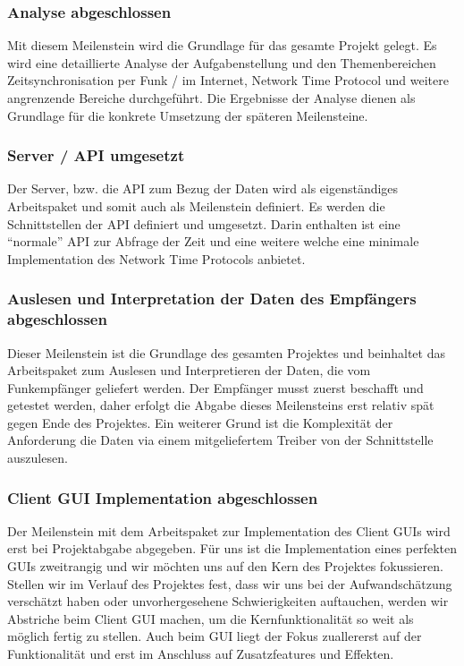 \subsubsection{Analyse abgeschlossen}
Mit diesem Meilenstein wird die Grundlage für das gesamte Projekt gelegt. Es wird eine detaillierte Analyse der Aufgabenstellung und den Themenbereichen Zeitsynchronisation per Funk / im Internet, Network Time Protocol und weitere angrenzende Bereiche durchgeführt. Die Ergebnisse der Analyse dienen als Grundlage für die konkrete Umsetzung der späteren Meilensteine.

\subsubsection{Server / API umgesetzt}
Der Server, bzw. die API zum Bezug der Daten wird als eigenständiges Arbeitspaket und somit auch als Meilenstein definiert. Es werden die Schnittstellen der API definiert und umgesetzt. Darin enthalten ist eine "`normale"' API zur Abfrage der Zeit und eine weitere welche eine minimale Implementation des Network Time Protocols anbietet.

\subsubsection{Auslesen und Interpretation der Daten des Empfängers abgeschlossen}
Dieser Meilenstein ist die Grundlage des gesamten Projektes und beinhaltet das Arbeitspaket zum Auslesen und Interpretieren der Daten, die vom Funkempfänger geliefert werden. Der Empfänger musst zuerst beschafft und getestet werden, daher erfolgt die Abgabe dieses Meilensteins erst relativ spät gegen Ende des Projektes. Ein weiterer Grund ist die Komplexität der Anforderung die Daten via einem mitgeliefertem Treiber von der Schnittstelle auszulesen.

\subsubsection{Client GUI Implementation abgeschlossen}
Der Meilenstein mit dem Arbeitspaket zur Implementation des Client GUIs wird erst bei Projektabgabe abgegeben. Für uns ist die Implementation eines perfekten GUIs zweitrangig und wir möchten uns auf den Kern des Projektes fokussieren. Stellen wir im Verlauf des Projektes fest, dass wir uns bei der Aufwandschätzung verschätzt haben oder unvorhergesehene Schwierigkeiten auftauchen, werden wir Abstriche beim Client GUI machen, um die Kernfunktionalität so weit als möglich fertig zu stellen. Auch beim GUI liegt der Fokus zuallererst auf der Funktionalität und erst im Anschluss auf Zusatzfeatures und Effekten.

